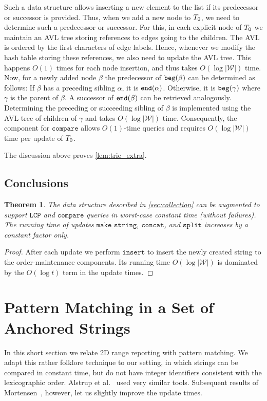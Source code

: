 \documentclass[a4paper]{article}
\newtheorem{theorem}{Theorem}[section]
\theoremstyle{remark}
\newcommand{\makeop}{\mathtt{make\_string}}
\newcommand{\compop}{\mathtt{compare}}
\newcommand{\concop}{\mathtt{concat}}
\newcommand{\splitop}{\mathtt{split}}
\newcommand{\lcpop}{\mathtt{LCP}}
\newcommand{\coll}{\mathcal{W}}
\newcommand{\insertop}{\mathtt{insert}}
\begin{document}
Such a data structure allows inserting a new element to the list if its predecessor or successor is provided.
Thus, when we add a new node to $T_0$, we need to determine such a predecessor or successor. For this, in each explicit node of $T_0$
we maintain an AVL tree storing references to edges going to the children. The AVL is ordered by the first characters of edge labels.
Hence, whenever we modify the hash table storing these references, we also need to update the AVL tree. This happens $O(1)$ times
for each node insertion, and thus takes $O(\log |\coll|)$ time. Now, for a newly added node $\beta$
the predecessor of $\mathtt{beg}(\beta)$ can be determined as follows: If $\beta$ has a preceding sibling $\alpha$, it is $\mathtt{end}(\alpha)$.
Otherwise, it is $\mathtt{beg}(\gamma)$ where $\gamma$ is the parent of $\beta$. A successor of $\mathtt{end}(\beta)$ can be retrieved analogously.
Determining the preceding or succeeding sibling of $\beta$ is implemented using the AVL tree of children of $\gamma$
and takes $O(\log |\coll|)$ time.
Consequently, the component for $\compop$ allows $O(1)$-time queries and requires $O(\log |\coll|)$ time per update of $T_0$.

The discussion above proves \cref{lem:trie_extra}.

\subsection{Conclusions}\label{sec:trie_conc}

\begin{theorem}\label{thm:persistent_compare}
The data structure described in \cref{sec:collection} can be augmented to support $\lcpop$ and $\compop$
queries in worst-case constant time (without failures). The running time of updates $\makeop$, $\concop$, and $\splitop$ increases by a constant factor only.
\end{theorem}

\begin{proof}
After each update we perform $\insertop$ to insert the newly created string to the order-maintenance components.
Its running time $O(\log |\coll|)$ is dominated by the $O(\log t)$ term in the update times.
\end{proof}


\section{Pattern Matching in a Set of Anchored Strings}\label{sec:anchored}
In this short section we relate 2D range reporting with pattern matching.
We adapt this rather folklore technique to our setting,
in which strings can be compared in constant time,
but do not have integer identifiers consistent with the lexicographic order.
Alstrup et al.~\cite{Alstrup} used very similar tools.
Subsequent results of Mortensen~\cite{Mortensen:2003}, however, let us slightly improve the update times.
\end{document}
